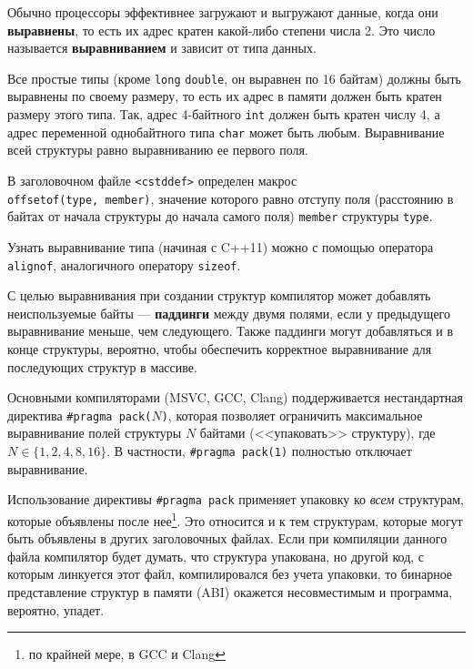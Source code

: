 Обычно процессоры эффективнее загружают и выгружают данные, когда они \textbf{выравнены},
то есть их адрес кратен какой-либо степени числа 2. Это число называется \textbf{выравниванием}
и зависит от типа данных.

Все простые типы (кроме \verb|long| \verb|double|,
он выравнен по 16 байтам) должны быть выравнены по своему размеру,
то есть их адрес в памяти должен быть кратен размеру этого типа.
Так, адрес 4-байтного \verb|int| должен быть кратен числу 4, а адрес переменной
однобайтного типа \verb|char| может быть любым.
Выравнивание всей структуры равно выравниванию ее первого поля.

В заголовочном файле \verb|<cstddef>| определен макрос\\ \verb|offsetof(type, member)|,
значение которого равно отступу поля (расстоянию в байтах от начала структуры до начала
самого поля) \verb|member| структуры \verb|type|.

Узнать выравнивание типа (начиная с C++11) можно с помощью
оператора \verb|alignof|, аналогичного оператору \verb|sizeof|.

С целью выравнивания при создании структур компилятор может добавлять
неиспользуемые байты --- \textbf{паддинги} между двумя полями,
если у предыдущего выравнивание меньше, чем следующего. Также паддинги
могут добавляться и в конце структуры, вероятно, чтобы обеспечить корректное
выравнивание для последующих структур в массиве.

Основными компиляторами (MSVC, GCC, Clang) поддерживается нестандартная директива
\verb|#pragma pack(|$N$\verb|)|, которая позволяет ограничить максимальное
выравнивание полей структуры $N$ байтами (<<упаковать>> структуру), где $N \in \{1,2,4,8,16\}$.
В частности, \verb|#pragma pack(1)| полностью отключает выравнивание.

Использование директивы \verb|#pragma pack|
применяет упаковку ко \textit{всем} структурам, которые объявлены после нее\footnote{по крайней мере, в GCC и Clang}.
Это относится и к тем структурам, которые могут быть объявлены в других заголовочных файлах.
Если при компиляции данного файла компилятор будет думать, что структура упакована,
но другой код, с которым линкуется этот файл, компилировался без учета упаковки,
то бинарное представление структур в памяти (ABI) окажется несовместимым и
программа, вероятно, упадет.

